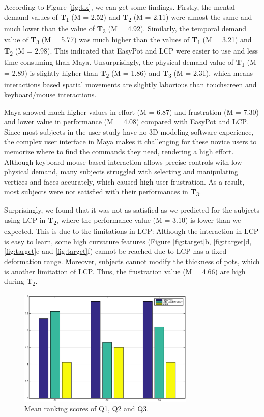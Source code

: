 \documentclass{svjour3}                     %
\begin{document}
According to Figure \ref{fig:tlx}, we can get some findings. 
Firstly, the mental demand values of \textbf{T}\textsubscript{1} (M = 2.52) and \textbf{T}\textsubscript{2} (M = 2.11) were almost the same and much lower than the value of \textbf{T}\textsubscript{3} (M = 4.92). Similarly, the temporal demand value of \textbf{T}\textsubscript{3} (M = 5.77) was much higher than the values of \textbf{T}\textsubscript{1} (M = 3.21) and \textbf{T}\textsubscript{2} (M = 2.98). This indicated that EasyPot and LCP were easier to use and less time-consuming than Maya. Unsurprisingly, the physical demand value of \textbf{T}\textsubscript{1} (M = 2.89) is slightly higher than \textbf{T}\textsubscript{2} (M = 1.86) and \textbf{T}\textsubscript{3} (M = 2.31), which means interactions based spatial movements are slightly laborious than touchscreen and keyboard/mouse interactions.

Maya showed much higher values in effort (M = 6.87) and frustration (M = 7.30) and lower value in performance (M = 4.08) compared with EasyPot and LCP.
Since most subjects in the user study have no 3D modeling software experience, the complex user interface in Maya makes it challenging for these novice users to memorize where to find the commands they need, rendering a high effort.
Although keyboard-mouse based interaction allows precise controls with low physical demand, many subjects struggled with selecting and manipulating vertices and faces accurately, which caused high user frustration. As a result, most subjects were not satisfied with their performances in \textbf{T}\textsubscript{3}.

Surprisingly, we found that it was not as satisfied as we predicted for the subjects using LCP in \textbf{T}\textsubscript{2}, where the performance value (M = 3.10) is lower than we expected. This is due to the limitations in LCP: Although the interaction in LCP is easy to learn, some high curvature features (Figure \ref{fig:target}b, \ref{fig:target}d, \ref{fig:target}e and \ref{fig:target}f) cannot be reached due to LCP has a fixed deformation range. Moreover, subjects cannot modify the thickness of pots, which is another limitation of LCP. Thus, the frustration value (M = 4.66) are high during \textbf{T}\textsubscript{2}.

\begin{figure}
	\includegraphics[width=0.75\textwidth]{fig15.eps}
	\caption{Mean ranking scores of Q1, Q2 and Q3.}
	\label{fig:ranking}
\end{figure}
\end{document}
